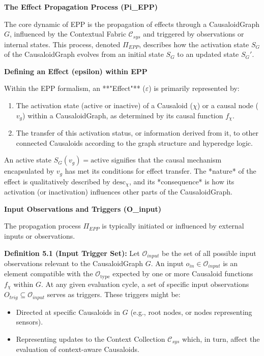 \textbf{The Effect Propagation Process (Pi\_EPP)}


The core dynamic of EPP is the propagation of effects through a CausaloidGraph \(G\), influenced by the Contextual Fabric \(\mathcal{C}_{sys}\) and triggered by observations or internal states. This process, denoted \(\Pi_{EPP}\), describes how the activation state \(S_G\) of the CausaloidGraph evolves from an initial state \(S_G\) to an updated state \(S_G'\).


\textbf{Defining an Effect (epsilon) within EPP}

Within the EPP formalism, an **"Effect"** (\(\varepsilon\)) is primarily represented by:
\begin{enumerate}
    \item The activation state (\(\text{active}\) or \(\text{inactive}\)) of a Causaloid (\(\chi\)) or a causal node (\(v_g\)) within a CausaloidGraph, as determined by its causal function \(f_\chi\).
    \item The transfer of this activation status, or information derived from it, to other connected Causaloids according to the graph structure and hyperedge logic.
\end{enumerate}
An active state \(S_G(v_g) = \text{active}\) signifies that the causal mechanism encapsulated by \(v_g\) has met its conditions for effect transfer. The *nature* of the effect is qualitatively described by \(\text{desc}_\chi\), and its *consequence* is how its activation (or inactivation) influences other parts of the CausaloidGraph.


\textbf{Input Observations and Triggers (O\_input)}

The propagation process \(\Pi_{EPP}\) is typically initiated or influenced by external inputs or observations.

\textbf{Definition 5.1 (Input Trigger Set):} Let \(\mathcal{O}_{input}\) be the set of all possible input observations relevant to the CausaloidGraph \(G\). An input \(o_{in} \in \mathcal{O}_{input}\) is an element compatible with the \(\mathcal{O}_{\text{type}}\) expected by one or more Causaloid functions \(f_\chi\) within \(G\).
At any given evaluation cycle, a set of specific input observations \(O_{trig} \subseteq \mathcal{O}_{input}\) serves as triggers. These triggers might be:
\begin{itemize}
    \item Directed at specific Causaloids in \(G\) (e.g., root nodes, or nodes representing sensors).
    \item Representing updates to the Context Collection \(\mathcal{C}_{sys}\) which, in turn, affect the evaluation of context-aware Causaloids.
\end{itemize}


